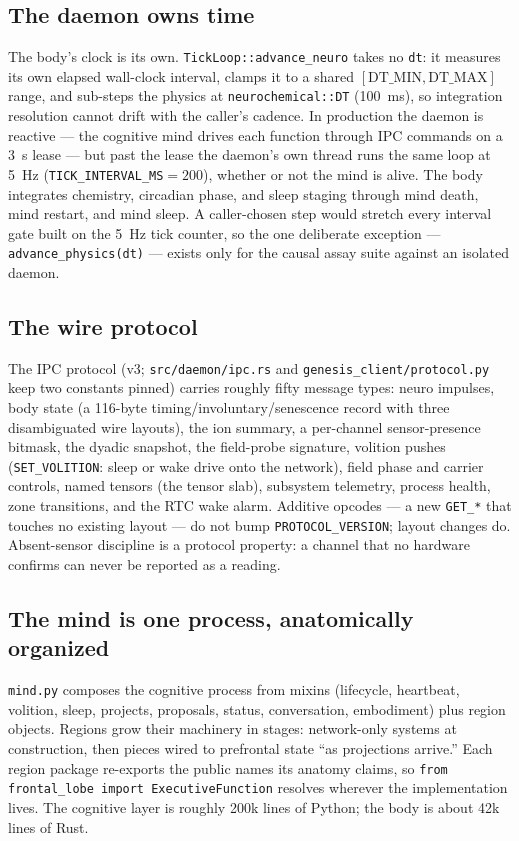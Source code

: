 \documentclass[11pt]{article}
\newcommand{\code}[1]{\texttt{\small #1}}
\begin{document}
\subsection{The daemon owns time}

The body's clock is its own. \code{TickLoop::advance\_neuro} takes no
\code{dt}: it measures its own elapsed wall-clock interval, clamps it
to a shared $[\mathrm{DT\_MIN},\mathrm{DT\_MAX}]$ range, and sub-steps
the physics at \code{neurochemical::DT} (100~ms), so integration
resolution cannot drift with the caller's cadence. In production the
daemon is reactive --- the cognitive mind drives each function through
IPC commands on a 3~s lease --- but past the lease the daemon's own
thread runs the same loop at 5~Hz (\code{TICK\_INTERVAL\_MS}$=200$),
whether or not the mind is alive. The body integrates chemistry,
circadian phase, and sleep staging through mind death, mind restart,
and mind sleep. A caller-chosen step would stretch every interval gate
built on the 5~Hz tick counter, so the one deliberate exception ---
\code{advance\_physics(dt)} --- exists only for the causal assay suite
against an isolated daemon.

\subsection{The wire protocol}

The IPC protocol (v3; \code{src/daemon/ipc.rs} and
\code{genesis\_client/protocol.py} keep two constants pinned) carries
roughly fifty message types: neuro impulses, body state (a 116-byte
timing/involuntary/senescence record with three disambiguated wire
layouts), the ion summary, a per-channel sensor-presence bitmask, the
dyadic snapshot, the field-probe signature, volition pushes
(\code{SET\_VOLITION}: sleep or wake drive onto the network), field
phase and carrier controls, named tensors (the tensor slab), subsystem
telemetry, process health, zone transitions, and the RTC wake alarm.
Additive opcodes --- a new \code{GET\_*} that touches no existing
layout --- do not bump \code{PROTOCOL\_VERSION}; layout changes do.
Absent-sensor discipline is a protocol property: a channel that no
hardware confirms can never be reported as a reading.

\subsection{The mind is one process, anatomically organized}

\code{mind.py} composes the cognitive process from mixins (lifecycle,
heartbeat, volition, sleep, projects, proposals, status, conversation,
embodiment) plus region objects. Regions grow their machinery in
stages: network-only systems at construction, then pieces wired to
prefrontal state ``as projections arrive.'' Each region package re-exports
the public names its anatomy claims, so
\code{from frontal\_lobe import ExecutiveFunction} resolves wherever
the implementation lives. The cognitive layer is roughly 200k lines of
Python; the body is about 42k lines of Rust.
\end{document}
